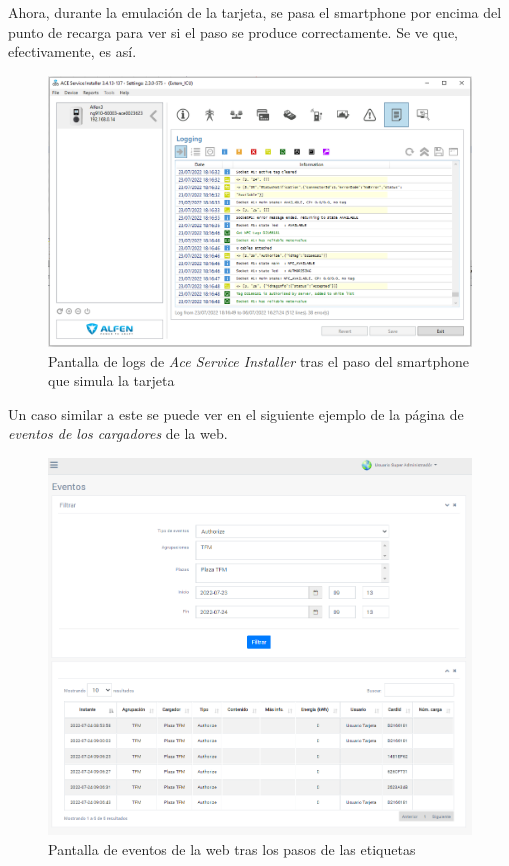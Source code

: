 \documentclass[12pt,a4paper,onecolumn,oneside]{report}
\begin{document}
Ahora, durante la emulación de la tarjeta, se pasa el smartphone por encima del punto de recarga para ver si el paso se produce correctamente. Se ve que, efectivamente, es así.


\begin{figure}[H]
\centering
  \includegraphics[width=1\textwidth]{figuras/authorize2.png}
  \caption[Pantalla de logs de \textit{Ace Service Installer} tras el paso del smartphone que simula la tarjeta]{Pantalla de logs de \textit{Ace Service Installer} tras el paso del smartphone que simula la tarjeta\\
  }
  \label{fig:authorize2}
\end{figure}


Un caso similar a este se puede ver en el siguiente ejemplo de la página de \textit{eventos de los cargadores} de la web.

\begin{figure}[H] 
\centering
  \includegraphics[width=1\textwidth]{figuras/authorize3.png}
  \caption[Pantalla de eventos de la web tras los pasos de las etiquetas]{Pantalla de eventos de la web tras los pasos de las etiquetas\\
  }
  \label{fig:authorize3}
\end{figure}
\end{document}
